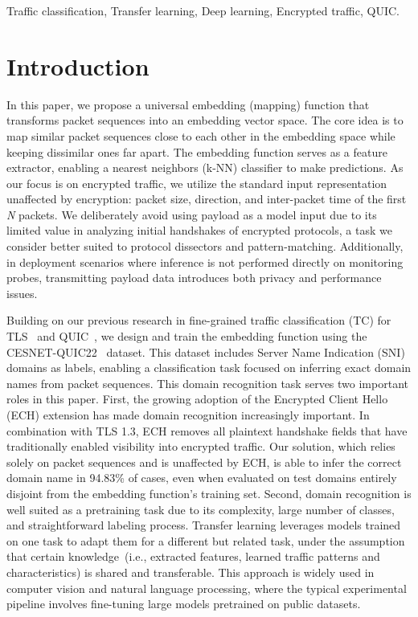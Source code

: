 \documentclass[lettersize,journal,twoside,article]{IEEEtran}
\begin{document}
\begin{IEEEkeywords}
Traffic classification, Transfer learning, Deep learning, Encrypted traffic, QUIC.
\end{IEEEkeywords}

\section{Introduction}

In this paper, we propose a universal embedding (mapping) function that transforms packet sequences into an embedding vector space. The core idea is to map similar packet sequences close to each other in the embedding space while keeping dissimilar ones far apart. The embedding function serves as a feature extractor, enabling a nearest neighbors (k-NN) classifier to make predictions. As our focus is on encrypted traffic, we utilize the standard input representation unaffected by encryption: packet size, direction, and inter-packet time of the first \textit{N} packets. We deliberately avoid using payload as a model input due to its limited value in analyzing initial handshakes of encrypted protocols, a task we consider better suited to protocol dissectors and pattern-matching. Additionally, in deployment scenarios where inference is not performed directly on monitoring probes, transmitting payload data introduces both privacy and performance issues.

Building on our previous research in fine-grained traffic classification (TC) for TLS~\cite{Luxemburk2023TLS} and QUIC~\cite{Luxemburk2023QUIC}, we design and train the embedding function using the CESNET-QUIC22~\cite{Luxemburk2023QUICDataset} dataset. This dataset includes Server Name Indication (SNI) domains as labels, enabling a classification task focused on inferring exact domain names from packet sequences. This domain recognition task serves two important roles in this paper. First, the growing adoption of the Encrypted Client Hello (ECH) extension has made domain recognition increasingly important. In combination with TLS 1.3, ECH removes all plaintext handshake fields that have traditionally enabled visibility into encrypted traffic. Our solution, which relies solely on packet sequences and is unaffected by ECH, is able to infer the correct domain name in 94.83\% of cases, even when evaluated on test domains entirely disjoint from the embedding function's training set. Second, domain recognition is well suited as a pretraining task due to its complexity, large number of classes, and straightforward labeling process. Transfer learning leverages models trained on one task to adapt them for a different but related task, under the assumption that certain knowledge~(i.e., extracted features, learned traffic patterns and characteristics) is shared and transferable. This approach is widely used in computer vision and natural language processing, where the typical experimental pipeline involves fine-tuning large models pretrained on public datasets.
\end{document}

